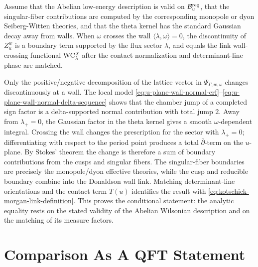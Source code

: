 \begin{controlledapproximation}
\label{ca:u-plane-wall-crossing-boundary}
Assume that the Abelian low-energy description is valid on
\(\mathcal B_u^{\rm reg}\), that the singular-fiber contributions are
computed by the corresponding monopole or dyon Seiberg-Witten theories, and
that the theta kernel has the standard Gaussian decay away from walls.  When
\(\omega\) crosses the wall \(\langle\lambda,\omega\rangle=0\), the
discontinuity of \(Z_u^w\) is a boundary term supported by the flux sector
\(\lambda\), and equals the link wall-crossing functional
{\rm WC}\({}_\lambda^X\) after the contact normalization and determinant-line
phase are matched.

Only the positive/negative decomposition of the lattice vector in
\(\Psi_{\Gamma,w,\omega}\) changes discontinuously at a wall.  The local
model \eqref{eq:u-plane-wall-normal-erf}--\eqref{eq:u-plane-wall-normal-delta-sequence}
shows that the chamber jump of a completed sign factor is a delta-supported
normal contribution with total jump \(2\).  Away from \(\lambda_+=0\), the
Gaussian factor in the theta kernel gives a smooth
\(\omega\)-dependent integral.  Crossing the wall changes the prescription
for the sector with \(\lambda_+=0\); differentiating with respect to the
period point produces a total \(\bar\partial\)-term on the \(u\)-plane.  By
Stokes' theorem the change is therefore a sum of boundary contributions from
the cusps and singular fibers.  The singular-fiber boundaries are precisely
the monopole/dyon effective theories, while the cusp and reducible boundary
combine into the Donaldson wall link.  Matching determinant-line orientations
and the contact term \(T(u)\) identifies the result with
\eqref{eq:kotschick-morgan-link-definition}.  This proves the conditional
statement: the analytic equality rests on the stated validity of the Abelian
Wilsonian description and on the matching of its measure factors.
\end{controlledapproximation}

\section{Comparison As A QFT Statement}

